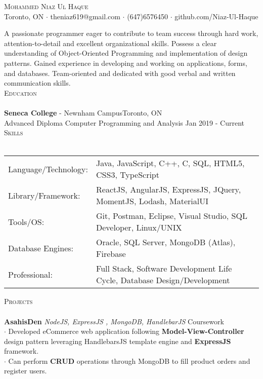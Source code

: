 \documentclass[a4paper]{article}
\newcommand{\lineunder} {
    \vspace*{-8pt} \\
    \hspace*{-18pt} \hrulefill \\
}
\newcommand{\header} [1] {
    {\hspace*{-18pt}\vspace*{6pt} \textsc{#1}}
    \vspace*{-6pt} \lineunder
}
\begin{document}
\vspace*{-40pt}

    

\vspace*{-10pt}
\begin{center}
	{\Huge \scshape {Mohammed Niaz Ul Haque}}\\
	Toronto, ON $\cdot$ theniaz619@gmail.com $\cdot$ (647)6576450 $\cdot$ github.com/Niaz-Ul-Haque\\
\end{center}

\text A passionate programmer eager to contribute to team success through hard work, attention-to-detail and excellent organizational skills. Possess a clear understanding of Object-Oriented Programming and implementation of design patterns. Gained experience in developing and working on applications, forms, and databases. Team-oriented and dedicated with good verbal and written communication skills.\\
\vspace{2mm}
{\large\header{Education}}
\textbf{Seneca College} - Newnham Campus\hfill Toronto, ON\\
{Advanced Diploma} Computer Programming and Analysis \hfill Jan 2019 - Current\\


\vspace{2mm}
{\large\header{Skills}}\vspace{1mm}
\begin{tabular}{ l l  }
	Language/Technology: & Java, JavaScript, C++, C, SQL, HTML5, CSS3, TypeScript  \\
	Library/Framework:   & ReactJS, AngularJS, ExpressJS, JQuery, MomentJS, Lodash, MaterialUI \\
	Tools/OS:               & Git, Postman, Eclipse, Visual Studio, SQL Developer, Linux/UNIX  \\
	Database Engines:      & Oracle, SQL Server, MongoDB (Atlas), Firebase                            \\
	Professional:      & Full Stack, Software Development Life Cycle, Database Design/Development 
                            \\
\end{tabular}
\vspace{0.3mm}

{\large\header{Projects}}\vspace{0.3mm}
{\textbf{AsahisDen}} {\sl NodeJS, ExpressJS , MongoDB, HandlebarJS} \hfill Coursework\\
$\cdot$ Developed eCommerce web application following {\textbf{Model-View-Controller}} design pattern leveraging HandlebarsJS template engine and {\textbf{ExpressJS}} framework.\\
$\cdot$ Can perform {\textbf{CRUD}} operations through MongoDB to fill product orders and register users.\\
\vspace*{2mm}
\end{document}
